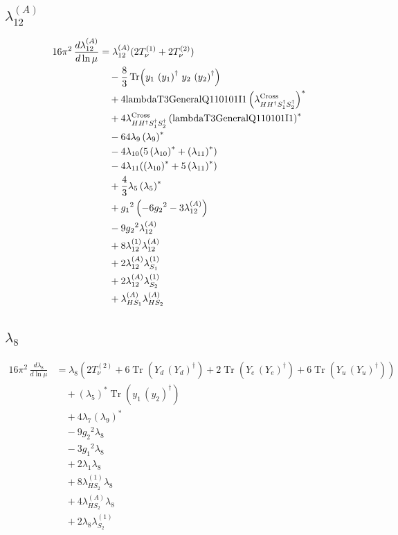 \documentclass[10pt,a4paper]{article}
\begin{document}
\subsection*{$\lambda_{12}^{(A)}$}
\begin{align*}
16\pi^2\,\frac{d \lambda_{12}^{(A)}}{d\ln\mu} &={\lambda_{12}^{(A)}} (2 T_{\nu}^{(1)}+2 T_{\nu}^{(2)}) \\
&\quad -\frac{8}{3} \operatorname{Tr}\!\left({y_1}\,\left({y_1}\right)^{\dagger}\,{y_2}\,\left({y_2}\right)^{\dagger}\right) \\
&\quad +4 \text{lambdaT3GeneralQ110101I1} \left({\lambda_{H H^\dagger S_1^\dagger S_2^\dagger}^{\rm Cross}}\right)^{*} \\
&\quad +4 {\lambda_{H H^\dagger S_1^\dagger S_2^\dagger}^{\rm Cross}} \left(\text{lambdaT3GeneralQ110101I1}\right)^{*} \\
&\quad -64 {\lambda_{9}} \left({\lambda_{9}}\right)^{*} \\
&\quad -4 {\lambda_{10}} (5 \left({\lambda_{10}}\right)^{*}+\left({\lambda_{11}}\right)^{*}) \\
&\quad -4 {\lambda_{11}} (\left({\lambda_{10}}\right)^{*}+5 \left({\lambda_{11}}\right)^{*}) \\
&\quad +\frac{4}{3} {\lambda_5} \left({\lambda_5}\right)^{*} \\
&\quad +{g_1}^2 \left(-6 {g_2}^2-3 {\lambda_{12}^{(A)}}\right) \\
&\quad -9 {g_2}^2 {\lambda_{12}^{(A)}} \\
&\quad +8 {\lambda_{12}^{(1)}} {\lambda_{12}^{(A)}} \\
&\quad +2 {\lambda_{12}^{(A)}} {\lambda_{S_1}^{(1)}} \\
&\quad +2 {\lambda_{12}^{(A)}} {\lambda_{S_2}^{(1)}} \\
&\quad +{\lambda_{HS_1}^{(A)}} {\lambda_{HS_2}^{(A)}} \\
\end{align*}
\subsection*{$\lambda_{8}$}
\begin{align*}
16\pi^2\,\frac{d \lambda_{8}}{d\ln\mu} &={\lambda_{8}} (2 T_{\nu}^{(2)}+6 \operatorname{Tr}\!\left({Y_d}\,\left({Y_d}\right)^{\dagger}\right)+2 \operatorname{Tr}\!\left({Y_e}\,\left({Y_e}\right)^{\dagger}\right)+6 \operatorname{Tr}\!\left({Y_u}\,\left({Y_u}\right)^{\dagger}\right)) \\
&\quad +\left({\lambda_5}\right)^{*} \operatorname{Tr}\!\left({y_1}\,\left({y_2}\right)^{\dagger}\right) \\
&\quad +4 {\lambda_{7}} \left({\lambda_{9}}\right)^{*} \\
&\quad -9 {g_2}^2 {\lambda_{8}} \\
&\quad -3 {g_1}^2 {\lambda_{8}} \\
&\quad +2 {\lambda_1} {\lambda_{8}} \\
&\quad +8 {\lambda_{HS_2}^{(1)}} {\lambda_{8}} \\
&\quad +4 {\lambda_{HS_2}^{(A)}} {\lambda_{8}} \\
&\quad +2 {\lambda_{8}} {\lambda_{S_2}^{(1)}} \\
\end{align*}
\end{document}
